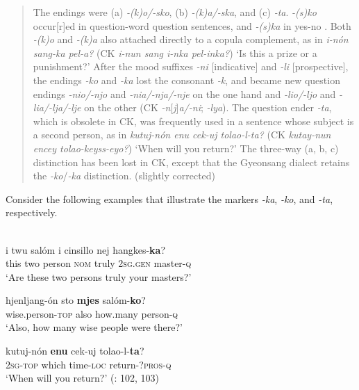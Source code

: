 \begin{quote}
The  endings were (a) \textit{-(k)o/-sko}, (b) \textit{-(k)a/-ska}, and (c) \textit{-ta}. \textit{-(s)ko} occur[r]ed in question-word question sentences, and \textit{-(s)ka} in yes-no . Both \textit{-(k)o} and \textit{-(k)a} also attached directly to a copula complement, as in \textit{i-nón sang-ka pel-a?} (CK \textit{i-nun sang i-nka pel-inka?}) ‘Is this a prize or a punishment?’ After the mood suffixes \textit{-ni} [indicative] and \textit{-li} [prospective], the endings \textit{-ko} and \textit{-ka} lost the consonant \textit{-k}, and became new question endings \textit{-nio/-njo} and \textit{-nia/-nja/-nje} on the one hand and \textit{-lio/-ljo} and \textit{-lia/-lja/-lje} on the other (CK \textit{-n}[\textit{j}]\textit{a/-ni}; \textit{-lya}). The question ender \textit{-ta}, which is obsolete in CK, was frequently used in a sentence whose subject is a second person, as in \textit{kutuj-nón enu cek-uj tolao-l-ta?} (CK \textit{kutay-nun encey tolao-keyss-eyo?}) ‘When will you return?’ The three-way (a, b, c) distinction has been lost in CK, except that the Gyeonsang dialect retains the \textit{-ko}/\textit{-ka} distinction. (slightly corrected)
\end{quote}

\noindent Consider the following examples that illustrate the markers \textit{-ka}, \textit{-ko}, and \textit{-ta}, respectively.

\ea%
    \label{ex:kore:24}
    \\
    \ea
    \gll i  twu  salóm  i  cinsillo    nej    hangkes-\textbf{{ka}}?\\
    this  two  person  \textsc{nom}  truly    2\textsc{sg}.\textsc{gen}  master-\textsc{q}\\
    \glt ‘Are these two persons truly your masters?’
    
    \ex
    \gll hjenljang-ón    sto \textbf{{mjes}} salóm-\textbf{{ko}}?\\
    wise.person-\textsc{top}  also  how.many  person-\textsc{q}\\
    \glt ‘Also, how many wise people were there?’
    
    \ex
    \gll kutuj-nón \textbf{{enu}} cek-uj    tolao-l-\textbf{{ta}}?\\
    2\textsc{sg-top}  which  time-\textsc{loc}  return-?\textsc{pros}-\textsc{q}\\
    \glt ‘When will you return?’ (\citealt{Sohn2012}: 102, 103)
    \z
    \z 

